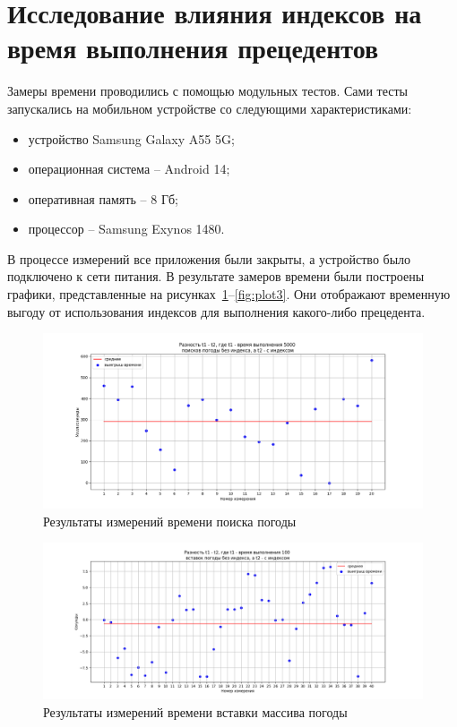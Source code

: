 \section{Исследование влияния индексов на время выполнения прецедентов}
Замеры времени проводились с помощью модульных тестов.
Сами тесты запускались на мобильном устройстве со следующими характеристиками:
\begin{itemize}
    \item устройство Samsung Galaxy A55 5G;
    \item операционная система -- Android 14;
    \item оперативная память -- 8 Гб;
    \item процессор -- Samsung Exynos 1480.
\end{itemize}
В процессе измерений все приложения были закрыты, а устройство было подключено к сети питания.
В результате замеров времени были построены графики, представленные на рисунках~\ref{fig:plot1}--\ref{fig:plot3}.
Они отображают временную выгоду от использования индексов для выполнения какого-либо прецедента.

\begin{figure}[H]
	\centering
	\includegraphics[width=\textwidth]{tools/img/plot1.png}
	\caption{
        Результаты измерений времени поиска погоды
    }
	\label{fig:plot1}
\end{figure}

\begin{figure}[H]
	\centering
	\includegraphics[width=\textwidth]{tools/img/plot2.png}
	\caption{
        Результаты измерений времени вставки массива погоды
    }
	\label{fig:plot2}
\end{figure}

